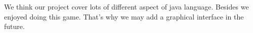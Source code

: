 We think our project cover lots of different aspect of java language.
Besides we enjoyed doing this game. That's why we may add a graphical interface in the future.
